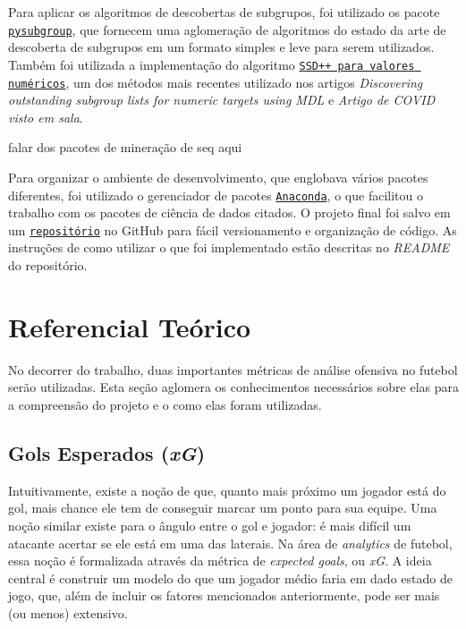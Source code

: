 \documentclass{article}
\begin{document}
Para aplicar os algoritmos de descobertas de subgrupos, foi utilizado os pacote
\href{https://pysubgroup.readthedocs.io/en/latest/}{\texttt{pysubgroup}}, que fornecem 
uma aglomeração de algoritmos do estado da arte de descoberta de subgrupos em um formato simples 
e leve para serem utilizados. Também foi utilizada a implementação do algoritmo 
\href{https://github.com/HMProenca/SSDpp-numeric/tree/master}{\texttt{SSD++ para valores numéricos}},
um dos métodos mais recentes utilizado nos artigos 
\textit{Discovering outstanding subgroup lists for numeric targets using MDL}
e \textit{Artigo de COVID visto em sala}.

falar dos pacotes de mineração de seq aqui

Para organizar o ambiente de desenvolvimento, que englobava vários pacotes
diferentes, foi utilizado o gerenciador de pacotes
\href{https://www.anaconda.com/}{\texttt{Anaconda}}, o que facilitou o trabalho
com os pacotes de ciência de dados citados. O projeto final foi salvo em um
\href{https://github.com/lframosferreira/projeto-ad}{\texttt{repositório}}
no GitHub para fácil versionamento e organização de código. As instruções de
como utilizar o que foi implementado estão descritas no \textit{README}
do repositório.

\section{Referencial Teórico}

No decorrer do trabalho, duas importantes métricas de análise ofensiva no
futebol serão utilizadas. Esta seção
aglomera os conhecimentos necessários sobre elas para a compreensão do projeto
e o como elas foram utilizadas.

\subsection{Gols Esperados (\textit{xG})}

Intuitivamente, existe a noção de que, quanto mais próximo um jogador está do
gol, mais chance ele tem de conseguir marcar um ponto para sua equipe. Uma
noção similar existe para o ângulo entre o gol e jogador: é mais difícil um
atacante acertar se ele está em uma das laterais. Na área de \textit{analytics}
de futebol, essa noção é formalizada através da métrica de \textit{expected
goals}, ou \textit{xG}. A ideia central é construir um modelo do que um jogador
médio faria em dado estado de jogo, que, além de incluir os fatores mencionados
anteriormente, pode ser mais (ou menos) extensivo.
\end{document}

